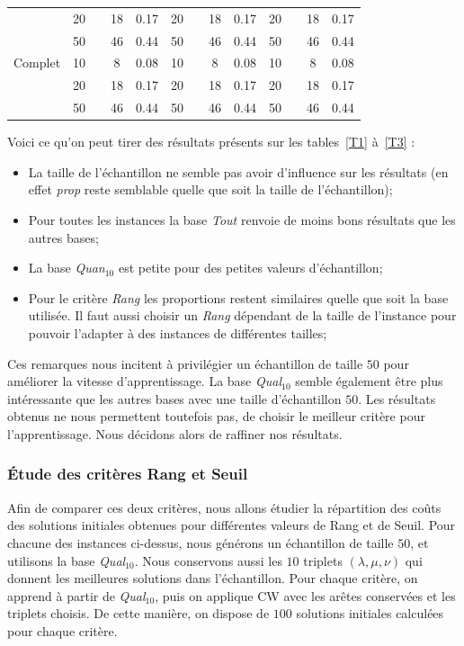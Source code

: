 \documentclass[a4paper,11pt]{article}%
\begin{document}
\begin{table}
\begin{center}
\begin{tabular}{|@{}c@{}|@{}c@{}|@{}c@{}|@{}c@{}|@{}c@{}||@{}c@{}|@{}c@{}|@{}c@{}|@{}c@{}||@{}c@{}|@{}c@{}|@{}c@{}|@{}c@{}|}
 \cline{2-13} 
    & 20& & 18 & 0.17 & 20& & 18 & 0.17 & 20& & 18 & 0.17  \\
  \cline{2-13} 
    & 50& & 46 & 0.44 & 50& & 46 & 0.44 & 50& & 46 & 0.44  \\
  \hline
   Complet & 10&  & 8 & 0.08 & 10&  & 8 & 0.08 & 10&  & 8 & 0.08  \\
 \cline{2-13} 
    & 20& & 18 & 0.17 & 20& & 18 & 0.17 & 20& & 18 & 0.17  \\
  \cline{2-13} 
    & 50& & 46 & 0.44 & 50& & 46 & 0.44 & 50& & 46 & 0.44  \\
  \hline
\end{tabular}
\end{center}
\end{table}

Voici ce qu'on peut tirer des résultats présents sur les tables~\ref{T1} à~\ref{T3} :

\begin{itemize}
\item La taille de l'échantillon ne semble pas avoir d'influence sur les résultats (en effet \emph{prop} reste semblable quelle que soit la taille de l'échantillon);
\item Pour toutes les instances la base \emph{Tout} renvoie de moins bons résultats que les autres bases;
\item La base \emph{Quan$_{10}$} est petite pour des petites valeurs d'échantillon;
\item Pour le critère \emph{Rang} les proportions restent similaires quelle que soit la base utilisée. Il faut aussi choisir un \emph{Rang} dépendant de la taille de l'instance pour pouvoir l'adapter à des instances de différentes tailles;
\end{itemize}

Ces remarques nous incitent à privilégier un échantillon de taille $50$ pour améliorer la vitesse d'apprentissage. 
La base \emph{Qual$_{10}$} semble également être plus intéressante que les autres bases avec une taille d'échantillon $50$.
Les résultats obtenus ne nous permettent toutefois pas, de choisir le meilleur critère pour l'apprentissage.
Nous décidons alors de raffiner nos résultats.

\subsubsection{Étude des critères Rang et Seuil}

Afin de comparer ces deux critères, nous allons étudier la répartition des coûts des solutions initiales obtenues pour différentes valeurs de Rang et de Seuil.  
Pour chacune des instances ci-dessus, nous générons un échantillon de taille $50$, et utilisons la base \emph{Qual$_{10}$}. Nous conservons aussi les $10$ triplets $(\lambda,\mu,\nu)$ qui donnent les meilleures solutions dans l'échantillon. 
Pour chaque critère, on apprend à partir de \emph{Qual$_{10}$}, puis on applique CW avec les arêtes conservées et les triplets choisis.
De cette manière, on dispose de $100$ solutions initiales calculées pour chaque critère.
\end{document}
